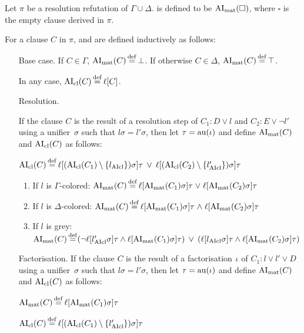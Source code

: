 \documentclass[,%
	draft=false,%
	numbers=noendperiod
	11pt,
	a4paper,
	oneside,%
	openany,
]{memoir}
\begin{document}


\begin{defi}
	Let $\pi$ be a resolution refutation of $\Gamma \cup \Delta$.
	 is defined to be $\operatorname{AI}_\mathrm{mat}(\square)$, where $\square$ is the empty clause derived in $\pi$.

	For a clause $C$ in $\pi$,  and  are defined inductively as follows:
	\begin{itemize}
		\item[Base case.]
			If $C \in \Gamma$, $\operatorname{AI}_\mathrm{mat}(C) \operatorname{\stackrel{\mathrm{def}}{=}} \bot$.
			If otherwise $C \in \Delta$, $\operatorname{AI}_\mathrm{mat}(C) \operatorname{\stackrel{\mathrm{def}}{=}} \top$.

			In any case, $\operatorname{AI}_\mathrm{cl}(C) \operatorname{\stackrel{\mathrm{def}}{=}} \ell[C]$.
		\item[Resolution.]

			If the clause $C$ is the result of a resolution step \inference{} of $C_1: D \lor l$ and $C_2: E \lor \lnot l'$ using a unifier~$\sigma$ such that $l\sigma = l'\sigma$,
			then
			let $\tau = \operatorname{au}(\iota)$ and
			define $\operatorname{AI}_\mathrm{mat}(C)$ and $\operatorname{AI}_\mathrm{cl}(C)$ as follows:

			$\operatorname{AI}_\mathrm{cl}(C) \operatorname{\stackrel{\mathrm{def}}{=}} \ell[(\operatorname{AI}_\mathrm{cl}(C_1) \setminus \{l_{\operatorname{AIcl}}\})\sigma]\tau \;\,{\lor}\;\, \ell[(\operatorname{AI}_\mathrm{cl}(C_2)\setminus \{l_{\operatorname{AIcl}}'\})\sigma]\tau $
			\begin{enumerate}

				\item If $l$ is $\Gamma$-colored:
					$\operatorname{AI}_\mathrm{mat}(C) \operatorname{\stackrel{\mathrm{def}}{=}} \ell[\operatorname{AI}_\mathrm{mat}(C_1)\sigma]\tau\;{\lor}\; \ell[\operatorname{AI}_\mathrm{mat}(C_2)\sigma]\tau $

				\item If $l$ is $\Delta$-colored:
					$\operatorname{AI}_\mathrm{mat}(C) \operatorname{\stackrel{\mathrm{def}}{=}} \ell[\operatorname{AI}_\mathrm{mat}(C_1)\sigma]\tau\;{\land}\; \ell[\operatorname{AI}_\mathrm{mat}(C_2)\sigma]\tau $

				\item If $l$ is grey:
					$\operatorname{AI}_\mathrm{mat}(C) \operatorname{\stackrel{\mathrm{def}}{=}}
					(\lnot {\ell[l'\ensuremath{_{\operatorname{AIcl}}}\sigma]}\tau \land \ell[\operatorname{AI}_\mathrm{mat}(C_1)\sigma]\tau) \;\,{\lor}\;\,
					(\ell[l_{\operatorname{AIcl}}\sigma]\tau \land \ell[\operatorname{AI}_\mathrm{mat}(C_2)\sigma]\tau)
					$

			\end{enumerate}

		\item[Factorisation.]
			If the clause $C$ is the result of a factorisation $\iota$ of $C_1: l \lor l' \lor D$ using a unifier~$\sigma$ such that $l\sigma = l'\sigma$,
			then let $\tau = \operatorname{au}(\iota)$ and define
			$\operatorname{AI}_\mathrm{mat}(C)$ and $\operatorname{AI}_\mathrm{cl}(C)$ as follows:

			$\operatorname{AI}_\mathrm{mat}(C) \operatorname{\stackrel{\mathrm{def}}{=}}{} \ell[\operatorname{AI}_\mathrm{mat}(C_1)\sigma]\tau$

			$\AIcl(C) \defeq \lifboth{ (\AIclause(C_1) \setminus\nolinebreak \{l'\cl\})\sigma}\tau$
			\qedhere

	\end{itemize}
\end{defi}
\end{document}
